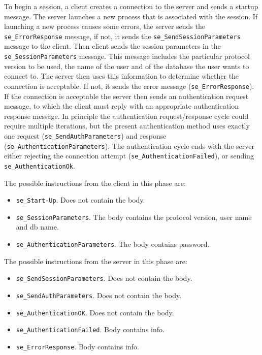\documentclass[a4paper,12pt]{article}
\newenvironment{citemize}
{\begin{itemize}
  \setlength{\itemsep}{0pt}
  \setlength{\parskip}{0pt}
  \setlength{\parsep}{0pt}}
{\end{itemize}}
\begin{document}
To begin a session, a client creates a connection to the server and sends a
startup message. The server launches a new process that is associated with the
session. If launching a new process causes some errors, the server sends the
\verb!se_ErrorResponse! message, if not, it sends the
\verb!se_SendSessionParameters! message to the client. Then client sends the
session parameters in the \verb!se_SessionParameters! message. This message
includes the particular protocol version to be used, the name of the user and of
the database the user wants to connect to. The server then uses this information
to determine whether the connection is acceptable. If not, it sends the error
message (\verb!se_ErrorResponse!). If the connection is acceptable the server
then sends an authentication request message, to which the client must reply
with an appropriate authentication response message. In principle the
authentication request/response cycle could require multiple iterations, but the
present authentication method uses exactly one request
(\verb!se_SendAuthParameters!) and response
(\verb!se_AuthenticationParameters!). The authentication cycle ends with the
server either rejecting the connection attempt (\verb!se_AuthenticationFailed!),
or sending \verb!se_AuthenticationOk!.

The possible instructions from the client in this phase are:
\begin{citemize}
\item \verb!se_Start-Up!. Does not contain the body.
\item \verb!se_SessionParameters!. The body contains the protocol version, user
name and db name.
\item \verb!se_AuthenticationParameters!. The body contains password.
\end{citemize}

The possible instructions from the server in this phase are:
\begin{citemize}
\item \verb!se_SendSessionParameters!. Does not contain the body.
\item \verb!se_SendAuthParameters!. Does not contain the body.
\item \verb!se_AuthenticationOK!. Does not contain the body.
\item \verb!se_AuthenticationFailed!. Body contains info.
\item \verb!se_ErrorResponse!. Body contains info.
\end{citemize}


\end{document}
